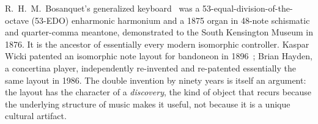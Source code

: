 \documentclass[10pt,letterpaper,twocolumn]{article}
\begin{document}
R.\ H.\ M.\ Bosanquet's generalized keyboard~\citep{bosanquet1875generalized} was a 53-equal-division-of-the-octave (53-EDO) enharmonic harmonium and a 1875 organ in 48-note schismatic and quarter-comma meantone, demonstrated to the South Kensington Museum in 1876. It is the ancestor of essentially every modern isomorphic controller. Kaspar Wicki patented an isomorphic note layout for bandoneon in 1896~\citep{wicki1896}; Brian Hayden, a concertina player, independently re-invented and re-patented essentially the same layout in 1986. The double invention by ninety years is itself an argument: the layout has the character of a \emph{discovery}, the kind of object that recurs because the underlying structure of music makes it useful, not because it is a unique cultural artifact.

\begin{figure}[t]
\centering
{}
\end{figure}
\end{document}
